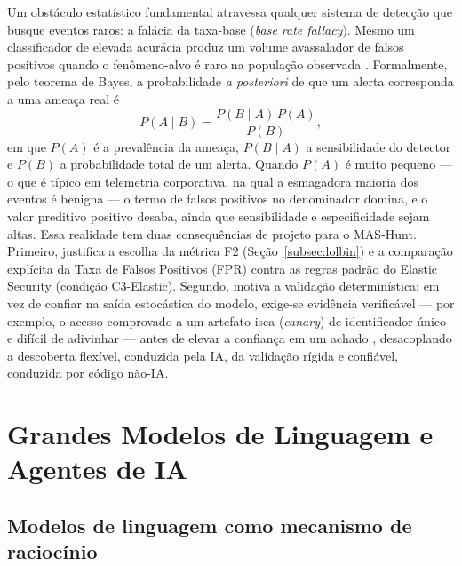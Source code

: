Um obstáculo estatístico fundamental atravessa qualquer sistema de detecção que busque eventos raros: a falácia da taxa-base (\textit{base rate fallacy}). Mesmo um classificador de elevada acurácia produz um volume avassalador de falsos positivos quando o fenômeno-alvo é raro na população observada \cite{dolan-gavitt2025}. Formalmente, pelo teorema de Bayes, a probabilidade \textit{a posteriori} de que um alerta corresponda a uma ameaça real é
\begin{equation}
P(A \mid B) = \frac{P(B \mid A)\,P(A)}{P(B)},
\label{eq:bayes}
\end{equation}
em que $P(A)$ é a prevalência da ameaça, $P(B\mid A)$ a sensibilidade do detector e $P(B)$ a probabilidade total de um alerta. Quando $P(A)$ é muito pequeno — o que é típico em telemetria corporativa, na qual a esmagadora maioria dos eventos é benigna — o termo de falsos positivos no denominador domina, e o valor preditivo positivo desaba, ainda que sensibilidade e especificidade sejam altas. Essa realidade tem duas consequências de projeto para o MAS-Hunt. Primeiro, justifica a escolha da métrica F2 (Seção~\ref{subsec:lolbin}) e a comparação explícita da Taxa de Falsos Positivos (FPR) contra as regras padrão do Elastic Security (condição C3-Elastic). Segundo, motiva a validação determinística: em vez de confiar na saída estocástica do modelo, exige-se evidência verificável — por exemplo, o acesso comprovado a um artefato-isca (\textit{canary}) de identificador único e difícil de adivinhar — antes de elevar a confiança em um achado \cite{dolan-gavitt2025}, desacoplando a descoberta flexível, conduzida pela IA, da validação rígida e confiável, conduzida por código não-IA.

\section{Grandes Modelos de Linguagem e Agentes de IA}
\label{sec:llms}

\subsection{Modelos de linguagem como mecanismo de raciocínio}
\label{subsec:llm}

